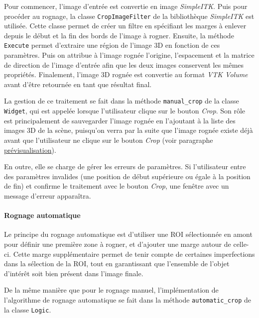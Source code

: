 \documentclass{article}
\newcommand{\subsubsubsection}[1]{\paragraph{#1}\par\noindent\bigskip}
\begin{document}
{{{{                Pour commencer, l'image d'entrée est convertie en image \textit{SimpleITK}.
                Puis pour procéder au rognage, la classe \texttt{CropImageFilter} de la bibliothèque \textit{SimpleITK} est utilisée. Cette classe permet de créer un filtre en spécifiant les marges à enlever depuis le début et la fin des bords de l'image à rogner.
                Ensuite, la méthode \texttt{Execute} permet d'extraire une région de l'image 3D en fonction de ces paramètres. Puis on attribue à l'image rognée l'origine, l'espacement et la matrice de direction de l'image d'entrée afin que les deux images conservent les mêmes propriétés.
                Finalement, l'image 3D rognée est convertie au format \textit{VTK Volume} avant d'être retournée en tant que résultat final.

                \bigskip

                La gestion de ce traitement se fait dans la méthode \texttt{manual\_crop} de la classe \texttt{Widget}, qui est appelée lorsque l'utilisateur clique sur le bouton \textit{Crop}. Son rôle est principalement de sauvegarder l'image rognée en l'ajoutant à la liste des images 3D de la scène, puisqu'on verra par la suite que l'image rognée existe déjà avant que l'utilisateur ne clique sur le bouton \textit{Crop} (voir paragraphe \hyperref[subsubsubsec:cropping-preview]{prévisualisation}).

                En outre, elle se charge de gérer les erreurs de paramètres. Si l'utilisateur entre des paramètres invalides (une position de début supérieure ou égale à la position de fin) et confirme le traitement avec le bouton \textit{Crop}, une fenêtre avec un message d'erreur apparaîtra.
            }

            {
                \bigskip
                \subsubsubsection{Rognage automatique}
                \label{subsubsubsec:automatic-cropping}

                Le principe du rognage automatique est d'utiliser une ROI sélectionnée en amont pour définir une première zone à rogner, et d'ajouter une marge autour de celle-ci. Cette marge supplémentaire permet de tenir compte de certaines imperfections dans la sélection de la ROI, tout en garantissant que l'ensemble de l'objet d'intérêt soit bien présent dans l'image finale.

                \bigskip

                De la même manière que pour le rognage manuel, l'implémentation de l'algorithme de rognage automatique se fait dans la méthode \texttt{automatic\_crop} de la classe \texttt{Logic}.

}}}}
\end{document}
